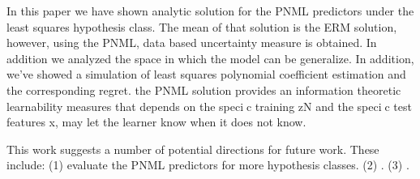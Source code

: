 \documentclass[letterpaper, 10 pt, conference]{ieeeconf}  %
\begin{document}
In this paper we have shown analytic solution for the PNML predictors under the least squares hypothesis class. The mean of that solution is the ERM solution, however, using the PNML, data based uncertainty measure is obtained. In addition we analyzed the space in which the model can be generalize. In addition, we've showed a simulation of least squares polynomial coefficient estimation and the corresponding regret. 
the PNML solution provides an information theoretic learnability
measures that depends on the specic training zN and the specic test features x, may let the
learner know when it does not know.

This work suggests a number of potential directions
for future work. These include: (1) evaluate the PNML predictors for more hypothesis classes. (2) . (3) .


\addtolength{\textheight}{-12cm}   %






\end{document}
